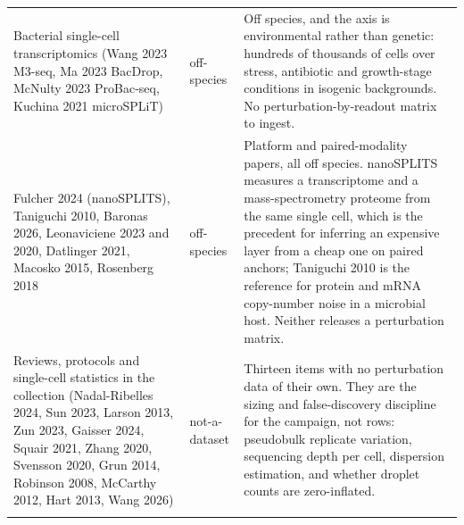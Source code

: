 \begin{longtable}{@{}L{62mm} L{22mm} L{85mm}@{}}
\addlinespace[5pt]
Bacterial single-cell transcriptomics (Wang 2023 M3-seq, Ma 2023 BacDrop, McNulty 2023 ProBac-seq, Kuchina 2021 microSPLiT) & off-species & Off species, and the axis is environmental rather than genetic: hundreds of thousands of cells over stress, antibiotic and growth-stage conditions in isogenic backgrounds. No perturbation-by-readout matrix to ingest. \\
\addlinespace[5pt]
Fulcher 2024 (nanoSPLITS), Taniguchi 2010, Baronas 2026, Leonaviciene 2023 and 2020, Datlinger 2021, Macosko 2015, Rosenberg 2018 & off-species & Platform and paired-modality papers, all off species. nanoSPLITS measures a transcriptome and a mass-spectrometry proteome from the same single cell, which is the precedent for inferring an expensive layer from a cheap one on paired anchors; Taniguchi 2010 is the reference for protein and mRNA copy-number noise in a microbial host. Neither releases a perturbation matrix. \\
\addlinespace[5pt]
Reviews, protocols and single-cell statistics in the collection (Nadal-Ribelles 2024, Sun 2023, Larson 2013, Zun 2023, Gaisser 2024, Squair 2021, Zhang 2020, Svensson 2020, Grun 2014, Robinson 2008, McCarthy 2012, Hart 2013, Wang 2026) & not-a-dataset & Thirteen items with no perturbation data of their own. They are the sizing and false-discovery discipline for the campaign, not rows: pseudobulk replicate variation, sequencing depth per cell, dispersion estimation, and whether droplet counts are zero-inflated. \\
\addlinespace[5pt]
\end{longtable}
\endgroup
